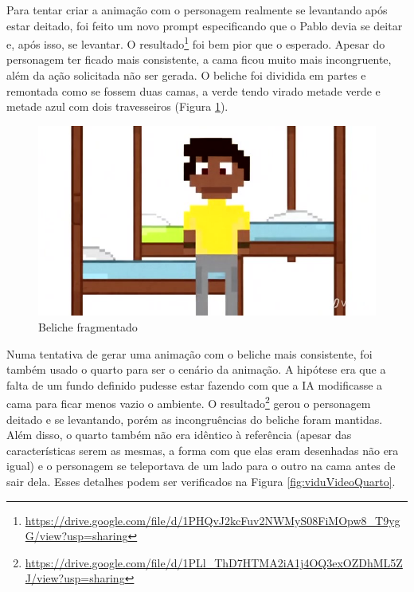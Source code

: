 Para tentar criar a animação com o personagem realmente se levantando após estar deitado, foi feito um novo prompt especificando que o Pablo devia se deitar e, após isso, se levantar. O resultado\footnote{\url{https://drive.google.com/file/d/1PHQvJ2kcFuv2NWMyS08FiMOpw8_T9ygG/view?usp=sharing}} foi bem pior que o esperado. Apesar do personagem ter ficado mais consistente, a cama ficou muito mais incongruente, além da ação solicitada não ser gerada. O beliche foi dividida em partes e remontada como se fossem duas camas, a verde tendo virado metade verde e metade azul com dois travesseiros (Figura \ref{fig:viduErrosCama2}).

\begin{figure}[htbp]
    \centering
    \caption{\small Beliche fragmentado}
    \label{fig:viduErrosCama2}
    \includegraphics[width=0.7\linewidth]{figs/vidu/frame7.jpg}
\end{figure}

Numa tentativa de gerar uma animação com o beliche mais consistente, foi também usado o quarto para ser o cenário da animação. A hipótese era que a falta de um fundo definido pudesse estar fazendo com que a IA modificasse a cama para ficar menos vazio o ambiente. O resultado\footnote{\url{https://drive.google.com/file/d/1PLl_ThD7HTMA2iA1j4OQ3exOZDhML5ZJ/view?usp=sharing}} gerou o personagem deitado e se levantando, porém as incongruências do beliche foram mantidas. Além disso, o quarto também não era idêntico à referência (apesar das características serem as mesmas, a forma com que elas eram desenhadas não era igual) e o personagem se teleportava de um lado para o outro na cama antes de sair dela. Esses detalhes podem ser verificados na Figura \ref{fig:viduVideoQuarto}.


